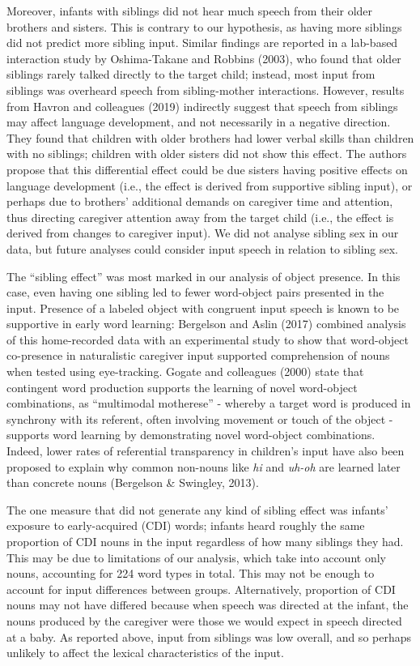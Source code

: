 \documentclass[
  english,
  man,floatsintext]{apa6}
\begin{document}
Moreover, infants with siblings did not hear much speech from their older brothers and sisters. This is contrary to our hypothesis, as having more siblings did not predict more sibling input. Similar findings are reported in a lab-based interaction study by Oshima-Takane and Robbins (2003), who found that older siblings rarely talked directly to the target child; instead, most input from siblings was overheard speech from sibling-mother interactions. However, results from Havron and colleagues (2019) indirectly suggest that speech from siblings may affect language development, and not necessarily in a negative direction. They found that children with older brothers had lower verbal skills than children with no siblings; children with older sisters did not show this effect. The authors propose that this differential effect could be due sisters having positive effects on language development (i.e., the effect is derived from supportive sibling input), or perhaps due to brothers' additional demands on caregiver time and attention, thus directing caregiver attention away from the target child (i.e., the effect is derived from changes to caregiver input). We did not analyse sibling sex in our data, but future analyses could consider input speech in relation to sibling sex.

The \enquote{sibling effect} was most marked in our analysis of object presence. In this case, even having one sibling led to fewer word-object pairs presented in the input. Presence of a labeled object with congruent input speech is known to be supportive in early word learning: Bergelson and Aslin (2017) combined analysis of this home-recorded data with an experimental study to show that word-object co-presence in naturalistic caregiver input supported comprehension of nouns when tested using eye-tracking. Gogate and colleagues (2000) state that contingent word production supports the learning of novel word-object combinations, as \enquote{multimodal motherese} - whereby a target word is produced in synchrony with its referent, often involving movement or touch of the object - supports word learning by demonstrating novel word-object combinations. Indeed, lower rates of referential transparency in children's input have also been proposed to explain why common non-nouns like \emph{hi} and \emph{uh-oh} are learned later than concrete nouns (Bergelson \& Swingley, 2013).

The one measure that did not generate any kind of sibling effect was infants' exposure to early-acquired (CDI) words; infants heard roughly the same proportion of CDI nouns in the input regardless of how many siblings they had. This may be due to limitations of our analysis, which take into account only nouns, accounting for 224 word types in total. This may not be enough to account for input differences between groups. Alternatively, proportion of CDI nouns may not have differed because when speech was directed at the infant, the nouns produced by the caregiver were those we would expect in speech directed at a baby. As reported above, input from siblings was low overall, and so perhaps unlikely to affect the lexical characteristics of the input.
\end{document}
